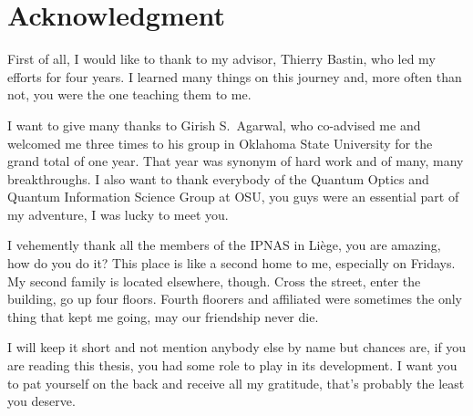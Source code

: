 \chapter*{Acknowledgment} 

First of all, I would like to thank to my advisor, Thierry Bastin, who led my efforts for four years. I learned many things on this journey and, more often than not, you were the one teaching them to me.

I want to give many thanks to Girish S.~Agarwal, who co-advised me and welcomed me three times to his group in Oklahoma State University for the grand total of one year. That year was synonym of hard work and of many, many breakthroughs. I also want to thank everybody of the Quantum Optics and Quantum Information Science Group at OSU, you guys were an essential part of my adventure, I was lucky to meet you.

I vehemently thank all the members of the IPNAS in Li\`ege, you are amazing, how do you do it? This place is like a second home to me, especially on Fridays. My second family is located elsewhere, though. Cross the street, enter the building, go up four floors. Fourth floorers and affiliated were sometimes the only thing that kept me going, may our friendship never die.

I will keep it short and not mention anybody else by name but chances are, if you are reading this thesis, you had some role to play in its development. I want you to pat yourself on the back and receive all my  gratitude, that's probably the least you deserve.